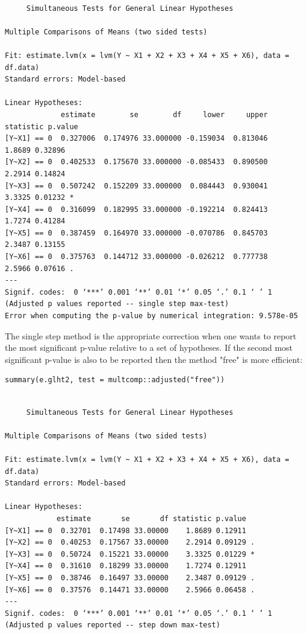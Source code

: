 \documentclass[12pt]{article}
\begin{document}
\begin{verbatim}

	 Simultaneous Tests for General Linear Hypotheses

Multiple Comparisons of Means (two sided tests) 

Fit: estimate.lvm(x = lvm(Y ~ X1 + X2 + X3 + X4 + X5 + X6), data = df.data)
Standard errors: Model-based

Linear Hypotheses:
             estimate        se        df     lower     upper statistic p.value  
[Y~X1] == 0  0.327006  0.174976 33.000000 -0.159034  0.813046    1.8689 0.32896  
[Y~X2] == 0  0.402533  0.175670 33.000000 -0.085433  0.890500    2.2914 0.14824  
[Y~X3] == 0  0.507242  0.152209 33.000000  0.084443  0.930041    3.3325 0.01232 *
[Y~X4] == 0  0.316099  0.182995 33.000000 -0.192214  0.824413    1.7274 0.41284  
[Y~X5] == 0  0.387459  0.164970 33.000000 -0.070786  0.845703    2.3487 0.13155  
[Y~X6] == 0  0.375763  0.144712 33.000000 -0.026212  0.777738    2.5966 0.07616 .
---
Signif. codes:  0 ‘***’ 0.001 ‘**’ 0.01 ‘*’ 0.05 ‘.’ 0.1 ‘ ’ 1
(Adjusted p values reported -- single step max-test) 
Error when computing the p-value by numerical integration: 9.578e-05
\end{verbatim}

The single step method is the appropriate correction when one wants to
report the most significant p-value relative to a set of
hypotheses. If the second most significant p-value is also to be
reported then the method "free" is more efficient:
\lstset{language=r,label= ,caption= ,captionpos=b,numbers=none}
\begin{lstlisting}
summary(e.glht2, test = multcomp::adjusted("free"))
\end{lstlisting}

\begin{verbatim}

	 Simultaneous Tests for General Linear Hypotheses

Multiple Comparisons of Means (two sided tests) 

Fit: estimate.lvm(x = lvm(Y ~ X1 + X2 + X3 + X4 + X5 + X6), data = df.data)
Standard errors: Model-based

Linear Hypotheses:
            estimate       se       df statistic p.value  
[Y~X1] == 0  0.32701  0.17498 33.00000    1.8689 0.12911  
[Y~X2] == 0  0.40253  0.17567 33.00000    2.2914 0.09129 .
[Y~X3] == 0  0.50724  0.15221 33.00000    3.3325 0.01229 *
[Y~X4] == 0  0.31610  0.18299 33.00000    1.7274 0.12911  
[Y~X5] == 0  0.38746  0.16497 33.00000    2.3487 0.09129 .
[Y~X6] == 0  0.37576  0.14471 33.00000    2.5966 0.06458 .
---
Signif. codes:  0 ‘***’ 0.001 ‘**’ 0.01 ‘*’ 0.05 ‘.’ 0.1 ‘ ’ 1
(Adjusted p values reported -- step down max-test)
\end{verbatim}
\end{document}
